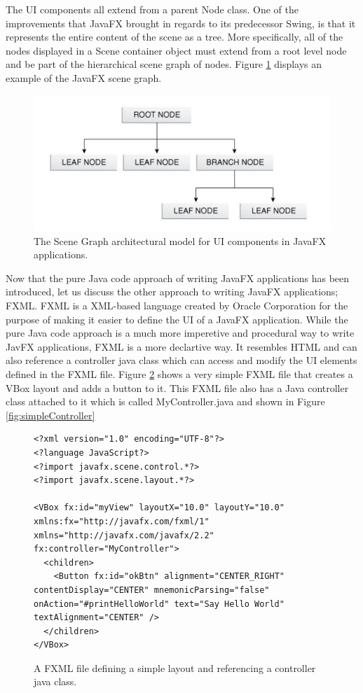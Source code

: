 The UI components all extend from a parent Node class. One of the improvements that JavaFX brought in regards to its predecessor Swing, is that it represents the entire content of the scene as a tree. More specifically, all of the nodes displayed in a Scene container object must extend from a root level node and be part of the hierarchical scene graph of nodes. Figure \ref{fig:javafxSceneGraph}  displays an example of the JavaFX scene graph. 
\begin{figure}[th]
\centering
\includegraphics[scale=0.5]{Figures/javafx_scenegraph.JPG}
\caption{The Scene Graph architectural model for UI components in JavaFX applications.}
\label{fig:javafxSceneGraph}
\end{figure}


Now that the pure Java code approach of writing JavaFX applications has been introduced, let us discuss the other approach to writing JavaFX applications; FXML. FXML is a XML-based language created by Oracle Corporation for the purpose of making it easier to define the UI of a JavaFX application. While the pure Java code approach is a much more imperetive and procedural way to write JavFX applications, FXML is a more declartive way. It resembles HTML and can also reference a controller java class which can access and modify the UI elements defined in the FXML file. Figure \ref{fig:simpleFXML} shows a very simple FXML file that creates a VBox layout and adds a button to it. This FXML file also has a Java controller class attached to it which is called MyController.java and shown in Figure \ref{fig:simpleController}

\begin{figure}[th]
\centering
\begin{lstlisting}
<?xml version="1.0" encoding="UTF-8"?>
<?language JavaScript?>
<?import javafx.scene.control.*?>
<?import javafx.scene.layout.*?>

<VBox fx:id="myView" layoutX="10.0" layoutY="10.0" xmlns:fx="http://javafx.com/fxml/1" xmlns="http://javafx.com/javafx/2.2" fx:controller="MyController">
  <children>
    <Button fx:id="okBtn" alignment="CENTER_RIGHT" contentDisplay="CENTER" mnemonicParsing="false" onAction="#printHelloWorld" text="Say Hello World" textAlignment="CENTER" />
  </children>
</VBox>
\end{lstlisting}
\caption{A FXML file defining a simple layout and referencing a controller java class.}
\label{fig:simpleFXML}
\end{figure}


